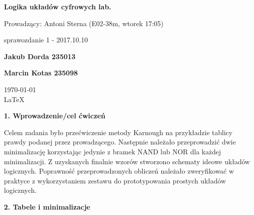\documentclass[12pt,a4paper]{report}
\begin{document}
	
	\begin{titlepage}
		
		\centering
		{\huge\bfseries Logika układów cyfrowych lab.\par}
		
		\vspace{0.5cm}
		Prowadzący: Antoni Sterna (E02-38m, wtorek 17:05) \\
	
		\vspace{1.1cm}
		{\Large sprawozdanie 1 - 2017.10.10\par}
		\vfill
		
		{\large\bfseries Jakub Dorda 235013\par}
		{\large\bfseries Marcin Kotas 235098\par}
		
		\vspace{1cm}
		\today \\ \LaTeX
		
		\restoregeometry
	\end{titlepage}
	
	
	{\large\bfseries 1. Wprowadzenie/cel ćwiczeń\\}
	
	Celem zadania było przećwiczenie metody Karnough na przykładzie tablicy prawdy podanej przez prowadzącego. Następnie należało przeprowadzić dwie minimalizację korzystając jedynie z bramek NAND lub NOR dla każdej minimalizacji. Z uzyskanych finalnie wzorów stworzono schematy ideowe układów logicznych. Poprawność przeprowadzonych obliczeń należało zweryfikować w praktyce z wykorzystaniem zestawu do prototypowania prostych układów logicznych. 
	
	\vspace{0.8cm}
	{\large\bfseries 2. Tabele i minimalizacje}
	
\end{document}
